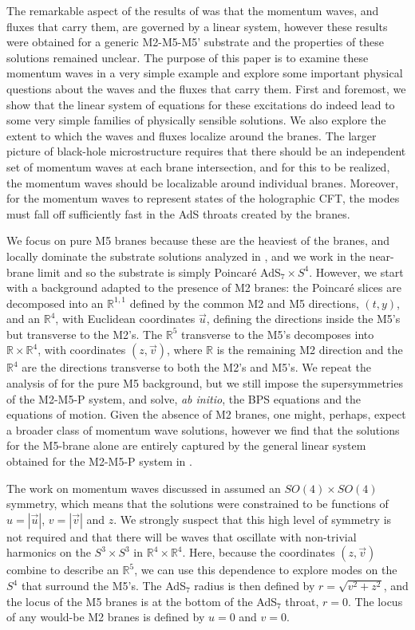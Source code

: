 \documentclass[11pt]{article}
\def\IR{\mathbb{R}}
\numberwithin{equation}{section}
\begin{document}
The remarkable aspect of the results of \cite{Bena:2024qed} was that the momentum waves, and fluxes that carry them, are governed by a linear system, however these results were obtained for a generic M2-M5-M5' substrate and the properties of these solutions remained unclear.   The purpose of this paper is to examine these momentum waves in a very simple example and explore some important physical questions about the waves and the fluxes that carry them.  First and foremost, we show that the linear system of equations for these excitations do indeed lead to some very simple families of physically sensible solutions.   We also explore the extent to which the waves and fluxes localize around the branes.  The larger picture of black-hole microstructure  requires that  there should be an independent set of momentum waves at each brane intersection, and for this to be realized, the momentum waves should be localizable around individual branes.  Moreover, for the momentum waves to represent  states of the holographic CFT, the modes must fall off sufficiently fast in the AdS throats created by the branes.  
 
We focus on pure M5 branes because these are the heaviest of the branes, and locally dominate the substrate solutions analyzed in \cite{Bena:2023rzm,Bena:2024qed,Bena:2024dre,Bena:2025hxt}, and we work in the near-brane limit and so the substrate is simply Poincar\'e  AdS$_7 \times S^4$.  However,  we start with a background  adapted to the presence of M2 branes: the Poincar\'e  slices are  decomposed into an $\IR^{1,1}$ defined by the common M2 and M5 directions, $(t,y)$, and an $\IR^4$, with Euclidean coordinates $\vec u$,  defining the directions inside the M5's but transverse to the M2's.  The $\IR^5$ transverse to the M5's  decomposes into $\IR \times \IR^4$, with coordinates  $(z, \vec v)$, where $\IR$ is the remaining M2 direction and the $\IR^4$ are the directions transverse to both the M2's and M5's.  We repeat the analysis of \cite{Bena:2024qed} for the pure M5 background, but we still impose the supersymmetries of the M2-M5-P system, and solve, {\it ab initio}, the  BPS equations and the equations of motion.   Given the absence of M2 branes, one might, perhaps, expect a broader class of momentum wave solutions, however we find that the solutions for the M5-brane alone are entirely captured by the general linear system obtained  for the M2-M5-P system in  \cite{Bena:2024qed}.

The work on momentum waves discussed in \cite{Bena:2024qed} assumed an $SO(4) \times SO(4)$ symmetry, which means that the solutions were constrained to be functions of $u = |\vec u|$, $v = |\vec v|$  and $z$.  We strongly suspect that this high level of symmetry is not required and that there will be waves that oscillate with non-trivial harmonics on the $S^3 \times S^3$ in $\IR^4 \times \IR^4$.  Here, because the coordinates $(z, \vec v)$ combine to describe an $\IR^5$, we can use this dependence to explore modes on the $S^4$ that surround the M5's. The AdS$_7$ radius is then defined by $r = \sqrt{v^2 +z^2}$, and the locus of the M5 branes is at the bottom of the  AdS$_7$ throat, $r=0$.   The locus of any would-be M2 branes is defined by $u=0$ and $v=0$. 
\end{document}
